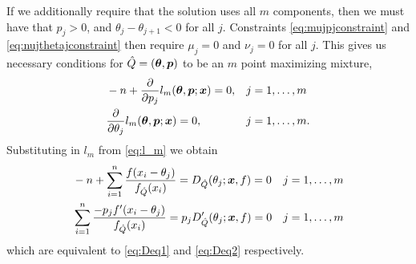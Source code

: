	If we additionally require that the solution uses all $m$ components, then we must have that $p_j > 0$, and $\theta_j - \theta_{j+1} < 0$ for all $j$. Constraints \eqref{eq:mujpjconstraint} and \eqref{eq:nujthetajconstraint} then require $\mu_j = 0$ and $\nu_j = 0$ for all $j$. This gives us necessary conditions for $\hat{Q} = ({\bm{{\theta}}}, {\bm{{p}}})$ to be an $m$ point maximizing mixture,
	\begin{align}
		&-n + \frac{\partial}{\partial p_j} l_m({\bm{{\theta}}},{\bm{{p}}};{\bm{{x}}}) = 0, && j = 1,\dots,m\\
		&\frac{\partial}{\partial \theta_j} l_m({\bm{{\theta}}},{\bm{{p}}};{\bm{{x}}}) = 0, && j = 1,\dots, m.
	\end{align}
	Substituting in $l_m$ from \eqref{eq:l_m} we obtain
	\begin{align}
		&-n + \sum_{i=1}^n \frac{f(x_i - \theta_j)}{f_{\hat{Q}}(x_i)} = D_{\hat{Q}}(\theta_j;{\bm{{x}}}, f) =  0 && j = 1, \dots, m \label{eq:KKT Deq1}\\
		&\sum_{i=1}^n \frac{-p_jf'(x_i - \theta_j)}{f_{\hat{Q}}(x_i)} = p_j D_{\hat{Q}}'(\theta_j;{\bm{{x}}}, f) = 0 && j = 1, \dots, m
		\label{eq:KKT Deq2}
	\end{align}
	which are equivalent to \eqref{eq:Deq1} and \eqref{eq:Deq2} respectively.


